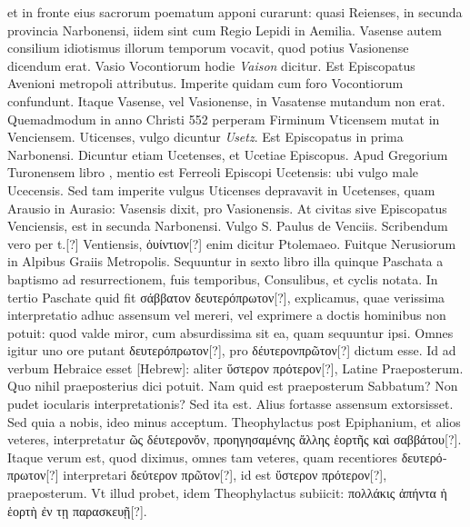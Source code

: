et in fronte eius sacrorum poematum apponi curarunt: quasi Reienses,
in secunda provincia Narbonensi, iidem sint cum Regio Lepidi
in Aemilia.
Vasense autem consilium idiotismus illorum temporum
vocavit, quod potius Vasionense dicendum erat.
Vasio Vocontiorum hodie \textit{Vaison} dicitur.
Est Episcopatus Avenioni metropoli
attributus.
Imperite quidam cum foro Vocontiorum confundunt.
Itaque Vasense, vel Vasionense, in Vasatense mutandum non
erat.
Quemadmodum in anno Christi 552 perperam Firminum
Vticensem mutat in Venciensem.
Uticenses, vulgo dicuntur \textit{Usetz}.
Est Episcopatus in prima Narbonensi.
Dicuntur etiam Ucetenses,
et Ucetiae Episcopus.
Apud Gregorium Turonensem libro ,
mentio est Ferreoli Episcopi Ucetensis: ubi vulgo male Ucecensis.
Sed tam imperite vulgus Uticenses depravavit in Ucetenses, quam
Arausio in Aurasio: Vasensis dixit, pro Vasionensis.
At civitas sive
Episcopatus Venciensis, est in secunda Narbonensi. Vulgo S. Paulus
de Venciis.
Scribendum vero per t.[?] Ventiensis,
 \textgreek{ὀυίντιον[?]} enim dicitur
Ptolemaeo.
Fuitque Nerusiorum in Alpibus Graiis Metropolis.
Sequuntur in sexto libro illa quinque Paschata a baptismo
ad resurrectionem, fuis temporibus, Consulibus, et cyclis notata.
In tertio Paschate quid fit
 \textgreek{σάββατον δευτερόπρωτον[?]}, explicamus,
quae verissima interpretatio adhuc assensum vel mereri, vel
exprimere a doctis hominibus non potuit: quod valde miror,
cum absurdissima sit ea, quam sequuntur ipsi.
Omnes igitur uno
ore putant \textgreek{δευτερόπρωτον[?]},
 pro \textgreek{δέυτερονπρῶτον[?]} dictum esse.
Id ad verbum
Hebraice esset \texthebrew{}[Hebrew]:
 aliter \textgreek{ὕστερον πρότερον[?]}, Latine Praeposterum.
Quo nihil praeposterius dici potuit.
Nam quid est praeposterum Sabbatum?
Non pudet iocularis interpretationis?
Sed ita est.
Alius fortasse assensum extorsisset.
Sed quia a nobis, ideo
minus acceptum.
Theophylactus post Epiphanium, et alios veteres,
interpretatur \textgreek{ῶς δέυτερονὄν,
 προηγησαμένης ἄλλης ἑορτῆς καὶ σαββάτου[?]}.
Itaque verum est, quod diximus, omnes tam veteres, quam
recentiores \textgreek{δευτερόπρωτον[?]} interpretari
 \textgreek{δεύτερον πρῶτον[?]}, id est \textgreek{ὕστερον
πρότερον[?]},
praeposterum.
Vt illud probet, idem Theophylactus
subiicit: \textgreek{πολλάκις ἀπήντα ἡ ἑορτὴ ἐν τῃ παρασκευῇ[?]}.
